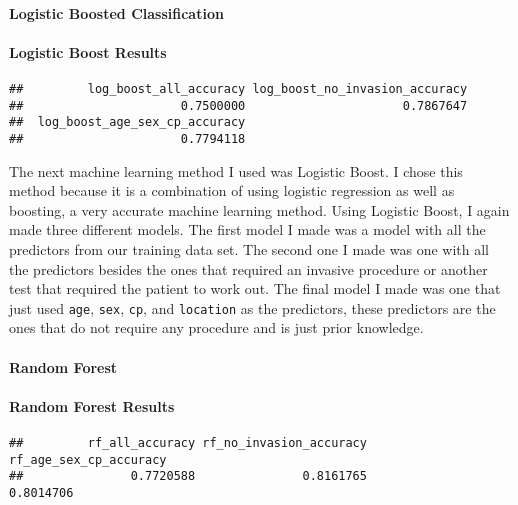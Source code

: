 \documentclass[
]{article}
\begin{document}
\hypertarget{logistic-boosted-classification}{%
\paragraph{Logistic Boosted
Classification}\label{logistic-boosted-classification}}

\hypertarget{logistic-boost-results}{%
\paragraph{Logistic Boost Results}\label{logistic-boost-results}}

\begin{verbatim}
##         log_boost_all_accuracy log_boost_no_invasion_accuracy 
##                      0.7500000                      0.7867647 
##  log_boost_age_sex_cp_accuracy 
##                      0.7794118
\end{verbatim}

The next machine learning method I used was Logistic Boost. I chose this
method because it is a combination of using logistic regression as well
as boosting, a very accurate machine learning method. Using Logistic
Boost, I again made three different models. The first model I made was a
model with all the predictors from our training data set. The second one
I made was one with all the predictors besides the ones that required an
invasive procedure or another test that required the patient to work
out. The final model I made was one that just used \texttt{age},
\texttt{sex}, \texttt{cp}, and \texttt{location} as the predictors,
these predictors are the ones that do not require any procedure and is
just prior knowledge.

\hypertarget{random-forest}{%
\paragraph{Random Forest}\label{random-forest}}

\hypertarget{random-forest-results}{%
\paragraph{Random Forest Results}\label{random-forest-results}}

\begin{verbatim}
##         rf_all_accuracy rf_no_invasion_accuracy  rf_age_sex_cp_accuracy 
##               0.7720588               0.8161765               0.8014706
\end{verbatim}
\end{document}
